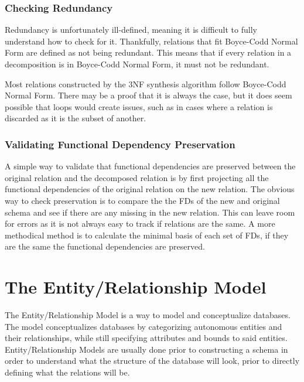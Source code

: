 \documentclass{report}
\begin{document}
\subsection{Checking Redundancy}

Redundancy is unfortunately ill-defined, meaning it is difficult to fully understand how to check for it. Thankfully, relations that fit Boyce-Codd Normal Form are defined as not being redundant. This means that if every relation in a decomposition is in  Boyce-Codd Normal Form, it must not be redundant.

\begin{note}
    Most relations constructed by the 3NF synthesis algorithm follow Boyce-Codd Normal Form. There may be a proof that it is always the case, but it does seem possible that loops would create issues, such as in cases where a relation is discarded as it is the subset of another. 
\end{note}

\subsection{Validating Functional Dependency Preservation}

A simple way to validate that functional dependencies are preserved between the original relation and the decomposed relation is by first projecting all the functional dependencies of the original relation on the new relation. The obvious way to check preservation is to compare the the FDs of the new and original schema and see if there are any missing in the new relation. This can leave room for errors as it is not always easy to track if relations are the same. A more methodical method is to calculate the minimal basis of each set of FDs, if they are the same the functional dependencies are preserved.


\chapter{The Entity/Relationship Model}
The Entity/Relationship Model is a way to model and conceptualize databases. The model conceptualizes databases by categorizing autonomous entities and their relationships, while still specifying attributes and bounds to said entities. Entity/Relationship Models are usually done prior to constructing a schema in order to understand what the structure of the database will look, prior to directly defining what the relations will be.
\end{document}
